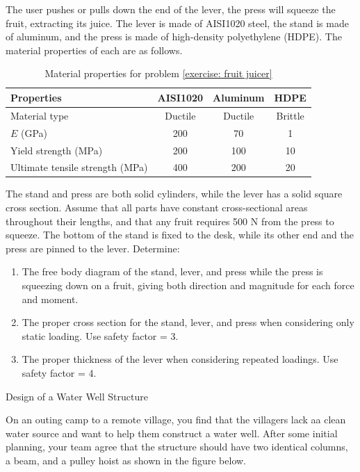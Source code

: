 \documentclass[
10pt,
a4paper,
openany,
svgnames,
]{book}
\newcommand{\exercise}{%
\item \label{lab:\arabic{chapter}-\arabic{exercisesi}}  %
}
\begin{document}
\begin{exercises}
  The user pushes or pulls down the end of the lever, the press will squeeze the fruit, extracting its juice. The lever is made of AISI1020 steel, the stand is made of aluminum, and the press is made of high-density polyethylene (HDPE). The material properties of each are as follows.
  
  \begin{table}
    \centering
    \caption{Material properties for problem \ref{exercise: fruit juicer}}
    \begin{tabular}{ lccc }
      \toprule
      Properties & AISI1020 & Aluminum & HDPE \\
      \midrule
      Material type & Ductile & Ductile & Brittle \\
      $E$ (GPa) & 200 & 70 & 1 \\
      Yield strength (MPa) & 200 & 100 & 10 \\
      Ultimate tensile strength (MPa) & 400 & 200 & 20 \\
      \bottomrule
    \end{tabular}
  \end{table}
  
  The stand and press are both solid cylinders, while the lever has a solid square cross section. Assume that all parts have constant cross-sectional areas throughout their lengths, and that any fruit requires 500 N from the press to squeeze. The bottom of the stand is fixed to the desk, while its other end and the press are pinned to the lever.
  Determine:
  \begin{enumerate}
  \item The free body diagram of the stand, lever, and press while the press is squeezing down on a fruit, giving both direction and magnitude for each force and moment.
  \item The proper cross section for the stand, lever, and press when considering only static loading. Use safety factor = 3.
  \item The proper thickness of the lever when considering repeated loadings. Use safety factor = 4.
  \end{enumerate}

  \exercise Design of a Water Well Structure

  On an outing camp to a remote village, you find that the villagers lack aa  clean water source and want to help them construct a water well. After some initial planning, your team agree that the structure should have two identical columns, a beam, and a pulley hoist as shown in the figure below.


\end{exercises}
\end{document}
